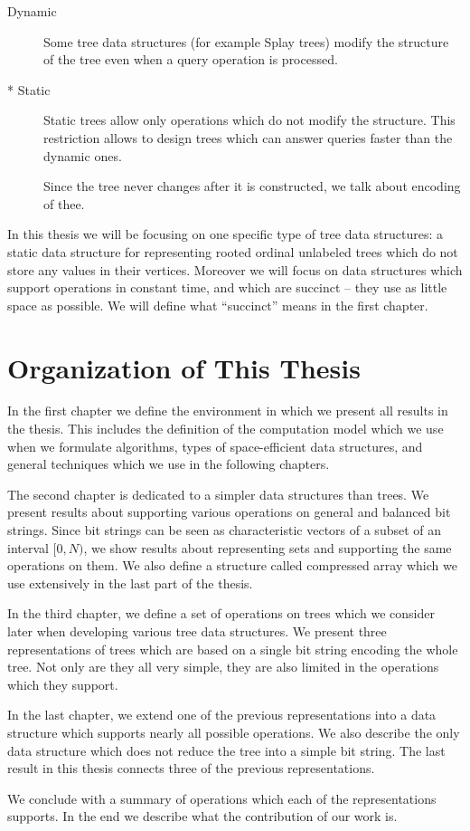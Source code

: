 \begin{description}
\begin{description}
		\item[Dynamic]
		Some tree data structures (for example Splay trees) modify the structure of the tree even when a query operation is processed.
		
		\item[* Static]
		Static trees allow only operations which do not modify the structure.
		This restriction allows to design trees which can answer queries faster than the dynamic ones.
		
		Since the tree never changes after it is constructed, we talk about encoding of thee.
	\end{description}
\end{description}

In this thesis we will be focusing on one specific type of tree data structures: a static data structure for representing rooted ordinal unlabeled trees which do not store any values in their vertices.
Moreover we will focus on data structures which support operations in constant time, and which are succinct -- they use as little space as possible.
We will define what ``succinct'' means in the first chapter.

\section*{Organization of This Thesis}

In the first chapter we define the environment in which we present all results in the thesis.
This includes the definition of the computation model which we use when we formulate algorithms, types of space-efficient data structures, and general techniques which we use in the following chapters.

The second chapter is dedicated to a simpler data structures than trees.
We present results about supporting various operations on general and balanced bit strings.
Since bit strings can be seen as characteristic vectors of a subset of an interval $[0, N)$, we show results about representing sets and supporting the same operations on them.
We also define a structure called compressed array which we use extensively in the last part of the thesis.

In the third chapter, we define a set of operations on trees which we consider later when developing various tree data structures.
We present three representations of trees which are based on a single bit string encoding the whole tree.
Not only are they all very simple, they are also limited in the operations which they support.

In the last chapter, we extend one of the previous representations into a data structure which supports nearly all possible operations.
We also describe the only data structure which does not reduce the tree into a simple bit string.
The last result in this thesis connects three of the previous representations.

We conclude with a summary of operations which each of the representations supports.
In the end we describe what the contribution of our work is.